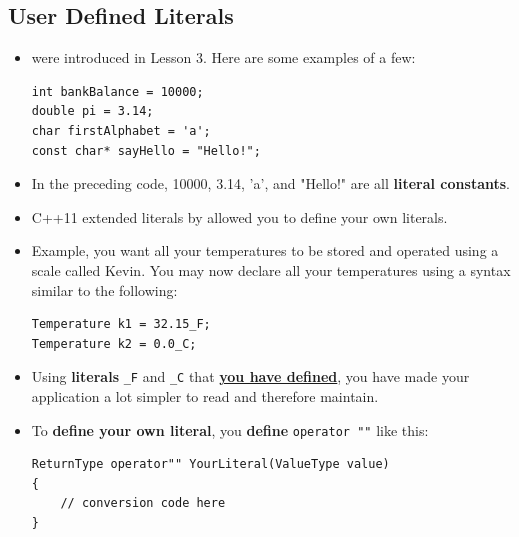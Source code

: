 \documentclass[10pt]{article}
\newcommand{\pbreak}{\vspace{30pt}}
\begin{document}
\subsection{User Defined Literals}
\begin{itemize}
	\item \textbf{} were introduced in Lesson 3. Here are some examples of a few:
	\begin{verbatim}
int bankBalance = 10000;
double pi = 3.14;
char firstAlphabet = 'a';
const char* sayHello = "Hello!";
	\end{verbatim}

\item In the preceding code, 10000, 3.14, 'a', and "Hello!" are all \textbf{literal constants}.

\item C++11 extended literals by allowed you to define your own literals.

\item Example, you want all your temperatures to be stored and operated using a scale called Kevin. You may now declare all your temperatures using a syntax similar to the following:
\begin{verbatim}
Temperature k1 = 32.15_F;
Temperature k2 = 0.0_C;
\end{verbatim}

\item Using \textbf{literals} \verb|_F| and \verb|_C| that \underline{\textbf{you have defined}}, you have made your application a lot simpler to read and therefore maintain.

	\pbreak

\item To \textbf{define your own literal}, you \textbf{define} \verb|operator ""| like this:
\begin{verbatim}
ReturnType operator"" YourLiteral(ValueType value)
{
	// conversion code here
}
\end{verbatim}
\end{itemize}

\pbreak
\end{document}
